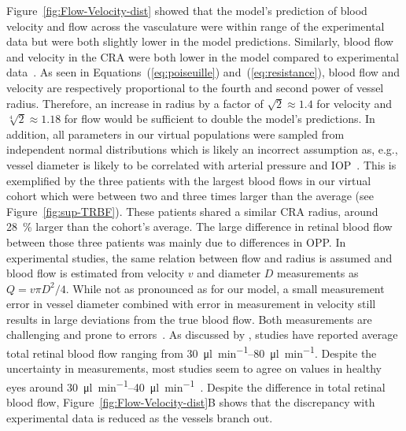 \documentclass[11pt,]{article}
\begin{document}
Figure~\ref{fig:Flow-Velocity-dist} showed that the model's prediction of blood velocity and flow across the vasculature were within range of the experimental data but were both slightly lower in the model predictions\cite{Riva1985,DoblhoffDier2014}.
Similarly, blood flow and velocity in the CRA were both lower in the model compared to experimental data~\cite{DoblhoffDier2014,Riva1985,Dorner2009,Feke_1989}.
As seen in Equations~(\ref{eq:poiseuille}) and~(\ref{eq:resistance}), blood flow and velocity are respectively proportional to the fourth and second power of vessel radius.
Therefore, an increase in radius by a factor of $\sqrt{2}\approx 1.4$ for velocity and $\sqrt[4]{2}\approx 1.18$ for flow would be sufficient to double the model's predictions.
In addition, all parameters in our virtual populations were sampled from independent normal distributions which is likely an incorrect assumption as, e.g., vessel diameter is likely to be correlated with arterial pressure and IOP~\cite{Dziedziak_2022}.
This is exemplified by the three patients with the largest blood flows in our virtual cohort which were between two and three times larger than the average (see Figure~\ref{fig:sup-TRBF}).
These patients shared a similar CRA radius, around \SI{28}{\percent} larger than the cohort's average.
The large difference in retinal blood flow between those three patients was mainly due to differences in OPP.
In experimental studies, the same relation between flow and radius is assumed and blood flow is estimated from velocity $v$ and diameter $D$ measurements as $Q=v\pi D^2/4$.
While not as pronounced as for our model, a small measurement error in vessel diameter combined with error in measurement in velocity still results in large deviations from the true blood flow.
Both measurements are challenging and prone to errors~\cite{Leitgeb_2014}.
As discussed by \citet{DoblhoffDier2014}, studies have reported average total retinal blood flow ranging from \SIrange[per-mode=symbol]{30}{80}{\micro\litre\per\minute}\cite{DoblhoffDier2014,Riva1985,Feke_1989}.
Despite the uncertainty in measurements, most studies seem to agree on values in healthy eyes around \SIrange{30}{40}{\micro\litre\per\minute}~\cite{DoblhoffDier2014,Riva1985}.
Despite the difference in total retinal blood flow, Figure~\ref{fig:Flow-Velocity-dist}B shows that the discrepancy with experimental data is reduced as the vessels branch out.
\end{document}
